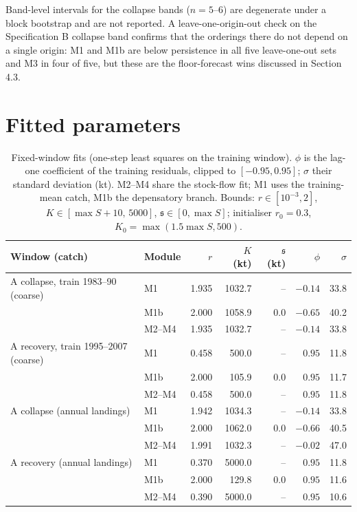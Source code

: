 \documentclass[preprint,11pt,authoryear]{elsarticle}
\theoremstyle{remark}
\newcommand{\sA}{\mathfrak{s}}
\begin{document}
Band-level intervals for the collapse bands ($n=5$--6) are degenerate under a block bootstrap and are not reported. A leave-one-origin-out check on the Specification B collapse band confirms that the orderings there do not depend on a single origin: M1 and M1b are below persistence in all five leave-one-out sets and M3 in four of five, but these are the floor-forecast wins discussed in Section 4.3.
\FloatBarrier
\section{Fitted parameters}\label{si:params}

\begin{table}[!htb]
\centering\small
\caption{Fixed-window fits (one-step least squares on the training window). $\phi$ is the lag-one coefficient of the training residuals, clipped to $[-0.95,0.95]$; $\sigma$ their standard deviation (kt). M2--M4 share the stock-flow fit; M1 uses the training-mean catch, M1b the depensatory branch. Bounds: $r\in[10^{-3},2]$, $K\in[\max S+10,\,5000]$, $\sA\in[0,\max S]$; initialiser $r_0=0.3$, $K_0=\max(1.5\max S, 500)$.}
\label{tab:si_fixedfits}
\begin{tabular}{@{}llrrrrr@{}}
\toprule
Window (catch) & Module & $r$ & $K$ (kt) & $\sA$ (kt) & $\phi$ & $\sigma$ \\
\midrule
A collapse, train 1983--90 (coarse) & M1 & 1.935 & 1032.7 & -- & $-0.14$ & 33.8 \\
 & M1b & 2.000 & 1058.9 & 0.0 & $-0.65$ & 40.2 \\
 & M2--M4 & 1.935 & 1032.7 & -- & $-0.14$ & 33.8 \\
A recovery, train 1995--2007 (coarse) & M1 & 0.458 & 500.0 & -- & $0.95$ & 11.8 \\
 & M1b & 2.000 & 105.9 & 0.0 & $0.95$ & 11.7 \\
 & M2--M4 & 0.458 & 500.0 & -- & $0.95$ & 11.8 \\
A collapse (annual landings) & M1 & 1.942 & 1034.3 & -- & $-0.14$ & 33.8 \\
 & M1b & 2.000 & 1062.0 & 0.0 & $-0.66$ & 40.5 \\
 & M2--M4 & 1.991 & 1032.3 & -- & $-0.02$ & 47.0 \\
A recovery (annual landings) & M1 & 0.370 & 5000.0 & -- & $0.95$ & 11.8 \\
 & M1b & 2.000 & 129.8 & 0.0 & $0.95$ & 11.6 \\
 & M2--M4 & 0.390 & 5000.0 & -- & $0.95$ & 10.6 \\
\bottomrule
\end{tabular}
\end{table}
\end{document}

